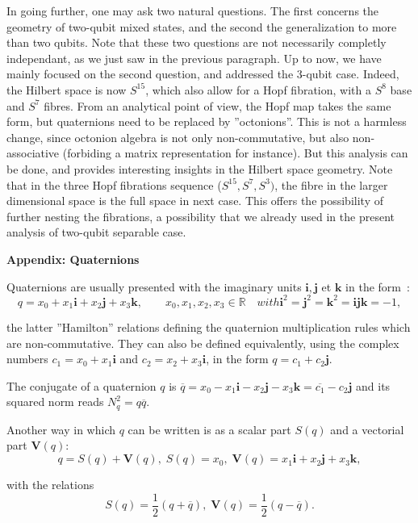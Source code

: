 \documentclass{amsart}
\begin{document}
In going further, one may ask two natural questions. The first concerns the
geometry of two-qubit mixed states, and the second the generalization to more
than two qubits. Note that these two questions are not necessarily completly
independant, as we just saw in the previous paragraph. Up to now, we have
mainly focused on the second question, and addressed the 3-qubit
case\cite{mosseri}. Indeed, the Hilbert space is now $S^{15}$, which also
allow for a Hopf fibration, with a $S^{8}$ base and $S^{7}$ fibres. From an
analytical point of view, the Hopf map takes the same form, but quaternions
need to be replaced by ''octonions''. This is not a harmless change, since
octonion algebra is not only non-commutative, but also non-associative
(forbiding a matrix representation for instance). But this analysis can be
done, and provides interesting insights in the Hilbert space geometry. Note
that in the three Hopf fibrations sequence ($S^{15},S^{7},S^{3})$, the fibre
in the larger dimensional space is the full space in next case. This offers
the possibility of further nesting the fibrations, a possibility that we
already used in the present analysis of two-qubit separable case.

\begin{center}
\textbf{Appendix: Quaternions}
\end{center}

Quaternions are usually presented with the imaginary units $\mathbf{i}%
,\mathbf{j}$ et $\mathbf{k}$ in the form~:%
\[
q=x_{0}+x_{1}\mathbf{i}+x_{2}\mathbf{j}+x_{3}\mathbf{k},\qquad x_{0}%
,x_{1},x_{2},x_{3}\in\mathbb{R}\quad with\mathbf{i}^{2}=\mathbf{j}%
^{2}=\mathbf{k}^{2}=\mathbf{ijk}=-1,
\]


the latter ''Hamilton'' relations defining the quaternion multiplication rules
which are non-commutative. They can also be defined equivalently, using the
complex numbers $c_{1}=x_{0}+x_{1}\mathbf{i}$ and $c_{2}=x_{2}+x_{3}%
\mathbf{i}$, in the form $q=c_{1}+c_{2}\mathbf{j}$.

The conjugate of a quaternion $q$ is $\overline{q}=x_{0}-x_{1}\mathbf{i}%
-x_{2}\mathbf{j}-x_{3}\mathbf{k=}\overline{c_{1}}-c_{2}\mathbf{j}$ and its
squared norm reads $N_{q}^{2}=q\overline{q}$.

Another way in which $q$ can be written is as a scalar part $S(q)$ and a
vectorial part $\mathbf{V}(q)$:%
\[
q=S(q)+\mathbf{V}(q),\;S(q)=x_{0},\;\mathbf{V}(q)=x_{1}\mathbf{i}%
+x_{2}\mathbf{j}+x_{3}\mathbf{k,}%
\]

with the relations%
\[
S(q)=\frac{1}{2}(q+\overline{q}),\;\mathbf{V}(q)=\frac{1}{2}(q-\overline{q}).
\]
\end{document}
